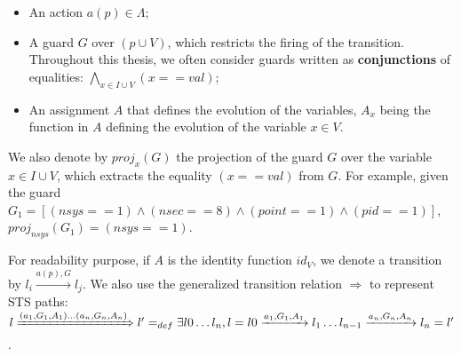 \begin{definition}
\begin{itemize}
		\begin{itemize}
            \item An action $a(p) \in \Lambda$;

            \item A guard $G$ over $(p \cup V)$, which
            restricts the firing of the transition. Throughout
            this thesis, we often consider guards written as
            \textbf{conjunctions} of equalities: $\displaystyle
            \bigwedge_{x \in I \cup V} (x == val)$;

            \item An assignment $A$ that defines the evolution
            of the variables, $A_x$ being the function in
            $A$ defining the evolution of the variable $x \in V$.
		\end{itemize}
	\end{itemize}

	\label{def:sts}
\end{definition}

We also denote by $proj_{x}(G)$ the projection of the guard $G$
over the variable $x \in I \cup V$, which extracts the equality
$(x==val)$ from $G$. For example, given the guard $G_1 =
[(nsys==1) \wedge (nsec==8) \wedge (point==1) \wedge (pid==1)]$,
$proj_{nsys}(G_1) = (nsys==1)$.

For readability purpose, if $A$ is the identity function $id_V$,
we denote a transition by $l_i \xrightarrow{a(p),G} l_j$. We
also use the generalized transition relation $\Rightarrow$ to
represent STS paths: $l \xRightarrow{(a_1,G_1,A_1)\dots
(a_n,G_n,A_n)} l' =_{def} \exists l0\dots l_n, l=l0
\xrightarrow{a_1,G_1,A_1} l_1\dots
l_{n-1}\xrightarrow{a_n,G_n,A_n}l_n=l'$.

